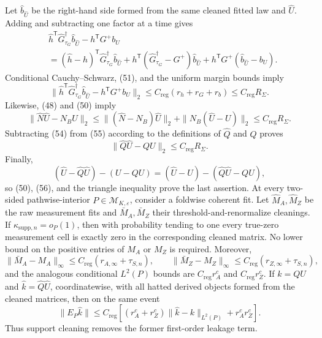 Let \(\widehat b_{\widehat U}\) be the right-hand side formed from the same cleaned fitted law and \(\widehat U\).  Adding and subtracting one factor at a time gives
\[
\begin{aligned}
 &\widehat h^{\mathsf T}\widehat G_{\tau_G}^{\dagger}\widehat b_{\widehat U}
   -h^{\mathsf T}G^+b_U\\
 &=(\widehat h-h)^{\mathsf T}\widehat G_{\tau_G}^{\dagger}\widehat b_{\widehat U}
   +h^{\mathsf T}(\widehat G_{\tau_G}^{\dagger}-G^+)\widehat b_{\widehat U}
   +h^{\mathsf T}G^+(\widehat b_{\widehat U}-b_U).
\end{aligned}                                                    \tag{53}
\]
Conditional Cauchy--Schwarz, (51), and the uniform margin bounds imply
\[
 \|\widehat h^{\mathsf T}\widehat G_{\tau_G}^{\dagger}\widehat b_{\widehat U}
   -h^{\mathsf T}G^+b_U\|_2
 \leq C_{\mathrm{reg}}(r_h+r_G+r_b)
 \leq C_{\mathrm{reg}}R_\Sigma.                                \tag{54}
\]
Likewise, (48) and (50) imply
\[
 \|\widehat N\widehat U-N_BU\|_2
 \leq\|(\widehat N-N_B)\widehat U\|_2+\|N_B(\widehat U-U)\|_2
 \leq C_{\mathrm{reg}}R_\Sigma.                                \tag{55}
\]
Subtracting (54) from (55) according to the definitions of \(\widehat Q\) and \(Q\) proves
\[
 \|\widehat Q\widehat U-QU\|_2\leq C_{\mathrm{reg}}R_\Sigma. \tag{56}
\]
Finally,
\[
 (\widehat U-\widehat Q\widehat U)-(U-QU)
 =(\widehat U-U)-(\widehat Q\widehat U-QU),
\]
so (50), (56), and the triangle inequality prove the last assertion.
At every two-sided pathwise-interior \(P\in\mathcal M_{K,\varepsilon}\), consider a foldwise coherent fit.  Let \(\widehat M_A,\widehat M_Z\) be the raw measurement fits and \(\bar M_A,\bar M_Z\) their threshold-and-renormalize cleanings.  If \(\kappa_{\mathrm{supp},n}=o_P(1)\), then with probability tending to one every true-zero measurement cell is exactly zero in the corresponding cleaned matrix.  No lower bound on the positive entries of \(M_A\) or \(M_Z\) is required.  Moreover,
\[
 \|\bar M_A-M_A\|_\infty\leq C_{\mathrm{reg}}(r_{A,\infty}+\tau_{S,n}),
 \qquad
 \|\bar M_Z-M_Z\|_\infty\leq C_{\mathrm{reg}}(r_{Z,\infty}+\tau_{S,n}),
\]
and the analogous conditional \(L^2(P)\) bounds are \(C_{\mathrm{reg}}r_A^c\) and \(C_{\mathrm{reg}}r_Z^c\).  If \(k=QU\) and \(\widehat k=\widehat Q\widehat U\), coordinatewise, with all hatted derived objects formed from the cleaned matrices, then on the same event
\[
 \|E_P\widehat k\|
 \leq C_{\mathrm{reg}}\left[
 (r_A^c+r_Z^c)\|\widehat k-k\|_{L^2(P)}+r_A^cr_Z^c
 \right].
\]
Thus support cleaning removes the former first-order leakage term.
